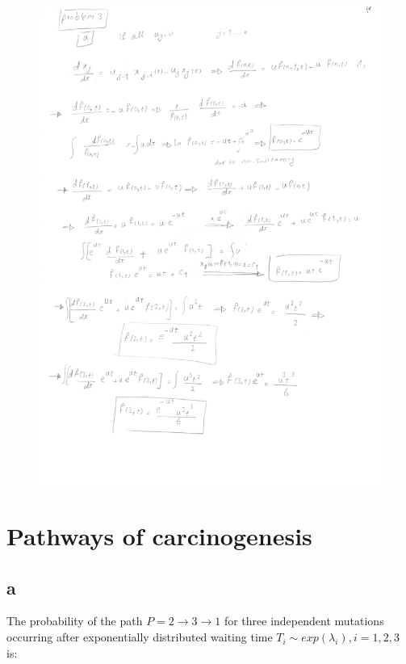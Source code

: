 \begin{figure}[htbp]
\centering
\includegraphics[scale=0.8, page=2]{./img/ex3}
\end{figure}
\newpage
\setcounter{chapter}{4}
\setcounter{section}{0}
\section{Pathways of carcinogenesis}
\subsection{a}
The probability of the path $ P = 2 \rightarrow 3 \rightarrow 1 $ for three independent mutations occurring after exponentially distributed waiting time $T_i \sim exp(\lambda_i), i = 1,2,3$ is:

